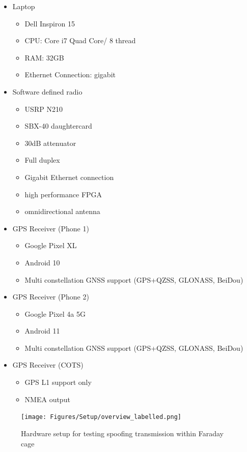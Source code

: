 \begin{itemize}
    \item Laptop
    \begin{itemize}
        \item Dell Inspiron 15
        \item CPU: Core i7 Quad Core/ 8 thread
        \item RAM: 32GB
        \item Ethernet Connection: gigabit
    \end{itemize}
    \item Software defined radio
    \begin{itemize}
        \item USRP N210
        \item SBX-40 daughtercard
        \item 30dB attenuator
        \item Full duplex
        \item Gigabit Ethernet connection
        \item high performance FPGA
        \item omnidirectional antenna
    \end{itemize}
    \item GPS Receiver (Phone 1)
    \begin{itemize}
        \item Google Pixel XL
        \item Android 10
        \item Multi constellation GNSS support (GPS+QZSS, GLONASS, BeiDou)
    \end{itemize}
    \item GPS Receiver (Phone 2)
    \begin{itemize}
        \item Google Pixel 4a 5G
        \item Android 11
        \item Multi constellation GNSS support (GPS+QZSS, GLONASS, BeiDou)
    \end{itemize}
    \item GPS Receiver (COTS)
    \begin{itemize}
        \item GPS L1 support only
        \item NMEA output
    \end{itemize}
\end{itemize}

\begin{figure}[!h]
    \begin{centering}
        \texttt{[image: Figures/Setup/overview\_labelled.png]}
        \caption{Hardware setup for testing spoofing transmission within Faraday cage}
    \label{fig:HardwareSetup}
    \end{centering}
\end{figure}

